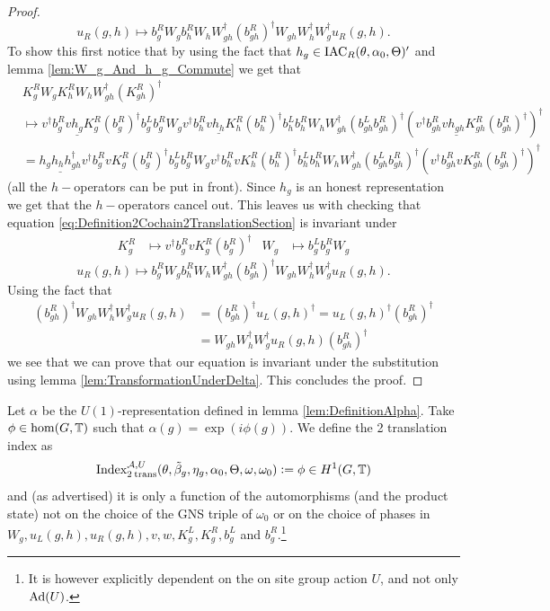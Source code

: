 \documentclass[12pt,a4paper,twoside]{article}
\numberwithin{equation}{section}
\begin{document}
\begin{proof}
\begin{equation}
		u_R(g,h)\mapsto b_g^R W_g b_h^R W_h W_{gh}^\dagger (b_{gh}^R)^\dagger W_{gh}W_h^\dagger W_g^\dagger u_R(g,h).
	\end{equation}
	To show this first notice that by using the fact that $h_g\in\textrm{IAC}_R(\theta,\alpha_0,\Theta)'$ and lemma \ref{lem:W_g_And_h_g_Commute} we get that
	\begin{align}
		&K_g^R W_g K_h^R W_ hW_{gh}^\dagger(K_{gh}^R)^\dagger\\
		&\mapsto v^\dagger b_g^R v \underline{h_g} K_g^R (b_g^R)^\dagger b_g^Lb_g^RW_g v^\dagger b_h^R v \underline{h_h} K_h^R (b_h^R)^\dagger b_h^Lb_h^RW_h W_{gh}^\dagger (b_{gh}^Lb_{gh}^R)^\dagger (v^\dagger b_{gh}^R v \underline{h_{gh}} K_{gh}^R (b_{gh}^R)^\dagger)^\dagger\\
		&=\underline{h_gh_hh_{gh}^\dagger} v^\dagger b_g^R v  K_g^R (b_g^R)^\dagger b_g^Lb_g^RW_g v^\dagger b_h^R v  K_h^R (b_h^R)^\dagger b_h^Lb_h^RW_h W_{gh}^\dagger (b_{gh}^Lb_{gh}^R)^\dagger (v^\dagger b_{gh}^R v  K_{gh}^R (b_{gh}^R)^\dagger)^\dagger
	\end{align}
	(all the $h-$operators can be put in front). Since $h_g$ is an honest representation we get that the $h-$operators cancel out. This leaves us with checking that equation \eqref{eq:Definition2Cochain2TranslationSection} is invariant under
	\begin{align}
		K_g^R&\mapsto v^\dagger b_g^R v K_g^R (b_g^R)^\dagger&W_g&\mapsto b_g^Lb_g^RW_g
	\end{align}
	\begin{equation}
		u_R(g,h)\mapsto b_g^R W_g b_h^R W_h W_{gh}^\dagger (b_{gh}^R)^\dagger W_{gh}W_h^\dagger W_g^\dagger u_R(g,h).
	\end{equation}
	Using the fact that
	\begin{align}
		(b_{gh}^R)^\dagger W_{gh}W_h^\dagger W_g^\dagger u_R(g,h)&=(b_{gh}^R)^\dagger u_L(g,h)^\dagger=u_L(g,h)^\dagger(b_{gh}^R)^\dagger\\
		&=W_{gh}W_h^\dagger W_g^\dagger u_R(g,h) (b_{gh}^R)^\dagger
	\end{align}
	we see that we can prove that our equation is invariant under the substitution using lemma \ref{lem:TransformationUnderDelta}. This concludes the proof.
\end{proof}
\begin{definition}
	Let $\alpha$ be the $U(1)$-representation defined in lemma \ref{lem:DefinitionAlpha}. Take $\phi\in\hom(G,\mathbb T)$ such that $\alpha(g)=\exp(i\phi(g))$. We define the 2 translation index as
	\begin{equation}
		\textrm{Index}_{2\:\text{trans}}^{\mathcal A,U}(\theta,\tilde{\beta}_g,\eta_g,\alpha_0,\Theta,\omega,\omega_0)\vcentcolon= \phi\in H^1(G,\mathbb T)
	\end{equation}
	and (as advertised) it is only a function of the automorphisms (and the product state) not on the choice of the GNS triple of $\omega_0$ or on the choice of phases in $W_g,u_L(g,h),u_R(g,h),v,w,K^L_g,K^R_g,b^L_g$ and $b^R_g$.\footnote{It is however explicitly dependent on the on site group action $U$, and not only $\Ad{U}$.}
\end{definition}
\end{document}
